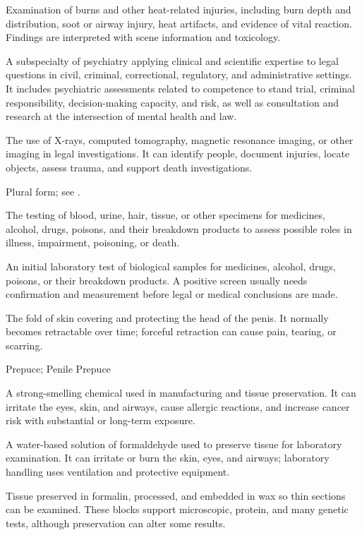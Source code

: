  Examination of burns and other heat-related injuries, including burn depth and distribution, soot or airway injury, heat artifacts, and evidence of vital reaction. Findings are interpreted with scene information and toxicology.

 A subspecialty of psychiatry applying clinical and scientific expertise to legal questions in civil, criminal, correctional, regulatory, and administrative settings.
It includes psychiatric assessments related to competence to stand trial,
criminal responsibility, decision-making capacity, and risk, as well as
consultation and research at the intersection of mental health and law.

 The use of X-rays, computed tomography, magnetic resonance imaging, or other imaging in legal investigations. It can identify people, document injuries, locate objects, assess trauma, and support death investigations.

 Plural form; see .

 The testing of blood, urine, hair, tissue, or other specimens for medicines, alcohol, drugs, poisons, and their breakdown products to assess possible roles in illness, impairment, poisoning, or death.

 An initial laboratory test of biological samples for medicines, alcohol, drugs, poisons, or their breakdown products. A positive screen usually needs confirmation and measurement before legal or medical conclusions are made.

 The fold of skin covering and protecting the head of the penis. It normally becomes retractable over time; forceful retraction can cause pain, tearing, or scarring.

\synonyms
Prepuce; Penile Prepuce

 A strong-smelling chemical used in manufacturing and tissue preservation. It can irritate the eyes, skin, and airways, cause allergic reactions, and increase cancer risk with substantial or long-term exposure.

 A water-based solution of formaldehyde used to preserve tissue for laboratory examination. It can irritate or burn the skin, eyes, and airways; laboratory handling uses ventilation and protective equipment.

 Tissue preserved in formalin, processed, and embedded in wax so thin sections can be examined. These blocks support microscopic, protein, and many genetic tests, although preservation can alter some results.


